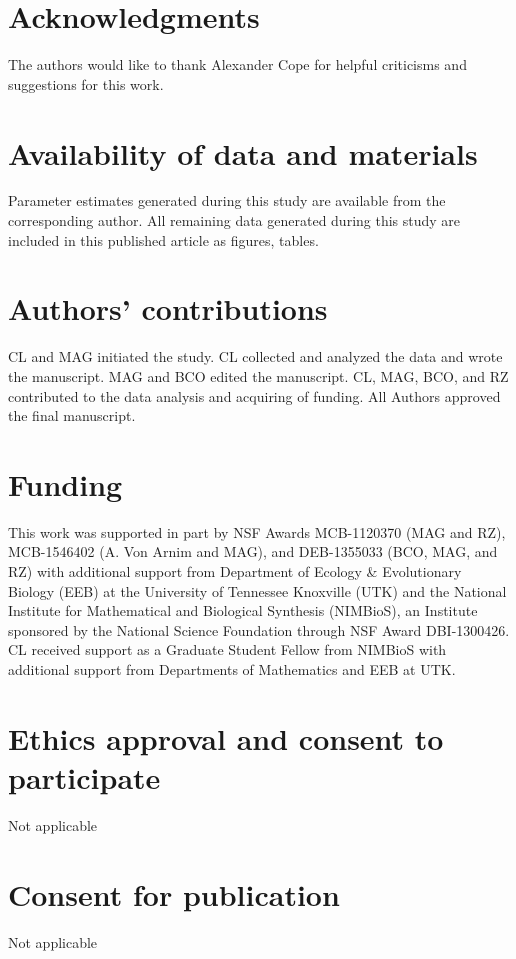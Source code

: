 \documentclass[doublespacing,linenumbers]{bmcart}
\begin{document}
\begin{backmatter}
  
\section*{Acknowledgments}
The authors would like to thank Alexander Cope for helpful criticisms and suggestions for this work.

\section*{Availability of data and materials}
Parameter estimates generated during this study are available from the corresponding author.
All remaining data generated during this study are included in this published article as figures, tables.

\section*{Authors' contributions}
CL and MAG initiated the study.
CL collected and analyzed the data and wrote the manuscript.
MAG and BCO edited the manuscript.
CL, MAG, BCO, and RZ contributed to the data analysis and acquiring of funding.
All Authors approved the final manuscript.
    
\section*{Funding}
This work was supported in part by NSF Awards MCB-1120370 (MAG and RZ),  MCB-1546402 (A. Von Arnim and MAG), and DEB-1355033 (BCO, MAG, and RZ) with additional support from Department of Ecology \& Evolutionary Biology (EEB) at the University of Tennessee Knoxville (UTK) and  the National Institute for Mathematical and Biological Synthesis (NIMBioS), an Institute sponsored by the National Science Foundation through NSF Award DBI-1300426.
CL received support as a Graduate Student Fellow from NIMBioS with additional support from Departments of Mathematics and EEB at UTK. 

\section*{Ethics approval and consent to participate}
Not applicable

\section*{Consent for publication}
Not applicable


\end{backmatter}
\end{document}
